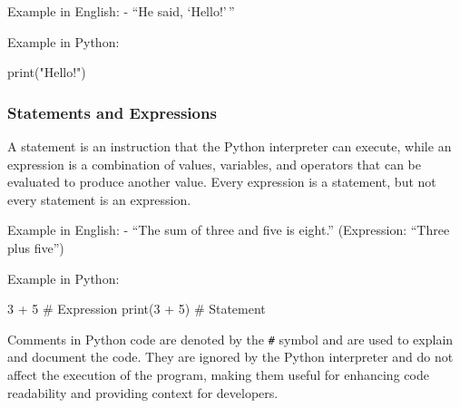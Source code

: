 \documentclass[
  letterpaper,
  DIV=11,
  numbers=noendperiod]{scrreprt}
\newenvironment{Shaded}{\begin{snugshade}}{\end{snugshade}}
\newcommand{\BuiltInTok}[1]{\textcolor[rgb]{0.00,0.23,0.31}{#1}}
\newcommand{\CommentTok}[1]{\textcolor[rgb]{0.37,0.37,0.37}{#1}}
\newcommand{\DecValTok}[1]{\textcolor[rgb]{0.68,0.00,0.00}{#1}}
\newcommand{\NormalTok}[1]{\textcolor[rgb]{0.00,0.23,0.31}{#1}}
\newcommand{\OperatorTok}[1]{\textcolor[rgb]{0.37,0.37,0.37}{#1}}
\newcommand{\StringTok}[1]{\textcolor[rgb]{0.13,0.47,0.30}{#1}}
\begin{document}
Example in English: - ``He said, `Hello!'\,''

Example in Python:

\begin{Shaded}
\begin{Highlighting}[]
\BuiltInTok{print}\NormalTok{(}\StringTok{"Hello!"}\NormalTok{)}
\end{Highlighting}
\end{Shaded}

\hypertarget{statements-and-expressions}{%
\subsubsection{Statements and
Expressions}\label{statements-and-expressions}}

A statement is an instruction that the Python interpreter can execute,
while an expression is a combination of values, variables, and operators
that can be evaluated to produce another value. Every expression is a
statement, but not every statement is an expression.

Example in English: - ``The sum of three and five is eight.''
(Expression: ``Three plus five'')

Example in Python:

\begin{Shaded}
\begin{Highlighting}[]
\DecValTok{3} \OperatorTok{+} \DecValTok{5}  \CommentTok{\# Expression}
\BuiltInTok{print}\NormalTok{(}\DecValTok{3} \OperatorTok{+} \DecValTok{5}\NormalTok{)  }\CommentTok{\# Statement}
\end{Highlighting}
\end{Shaded}

\begin{tcolorbox}[enhanced jigsaw, coltitle=black, colback=white, bottomrule=.15mm, arc=.35mm, titlerule=0mm, opacitybacktitle=0.6, toptitle=1mm, left=2mm, toprule=.15mm, opacityback=0, bottomtitle=1mm, title=\textcolor{quarto-callout-note-color}{\faInfo}\hspace{0.5em}{Note}, rightrule=.15mm, colframe=quarto-callout-note-color-frame, breakable, colbacktitle=quarto-callout-note-color!10!white, leftrule=.75mm]

Comments in Python code are denoted by the \texttt{\#} symbol and are
used to explain and document the code. They are ignored by the Python
interpreter and do not affect the execution of the program, making them
useful for enhancing code readability and providing context for
developers.

\end{tcolorbox}
\end{document}
